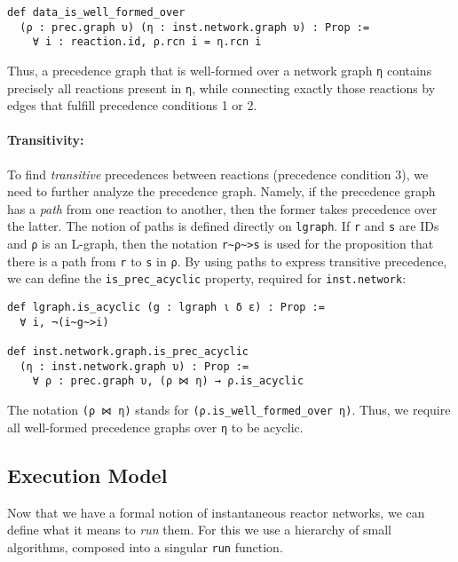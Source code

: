 \begin{lstlisting}
def data_is_well_formed_over 
  (ρ : prec.graph υ) (η : inst.network.graph υ) : Prop :=
    ∀ i : reaction.id, ρ.rcn i = η.rcn i
\end{lstlisting}

\noindent Thus, a precedence graph that is well-formed over a network graph \lstinline{η} contains precisely all reactions present in \lstinline{η}, while connecting exactly those reactions by edges that fulfill precedence conditions 1 or 2.

\paragraph{Transitivity:}

To find \emph{transitive} precedences between reactions (precedence condition 3), we need to further analyze the precedence graph.
Namely, if the precedence graph has a \emph{path} from one reaction to another, then the former takes precedence over the latter.
The notion of paths is defined directly on \lstinline{lgraph}. 
If \lstinline{r} and \lstinline{s} are IDs and \lstinline{ρ} is an L-graph, then the notation \lstinline{r~ρ~>s} is used for the proposition that there is a path from \lstinline{r} to \lstinline{s} in \lstinline{ρ}.
By using paths to express transitive precedence, we can define the \lstinline{is_prec_acyclic} property, required for \lstinline{inst.network}:

\begin{lstlisting}
def lgraph.is_acyclic (g : lgraph ι δ ε) : Prop := 
  ∀ i, ¬(i~g~>i)

def inst.network.graph.is_prec_acyclic 
  (η : inst.network.graph υ) : Prop :=
    ∀ ρ : prec.graph υ, (ρ ⋈ η) → ρ.is_acyclic
\end{lstlisting}

\noindent The notation \lstinline{(ρ ⋈ η)} stands for \lstinline{(ρ.is_well_formed_over η)}.
Thus, we require all well-formed precedence graphs over \lstinline{η} to be acyclic.

\subsection{Execution Model}
\label{section:execution-model}

Now that we have a formal notion of instantaneous reactor networks, we can define what it means to \emph{run} them.
For this we use a hierarchy of small algorithms, composed into a singular \lstinline{run} function.

